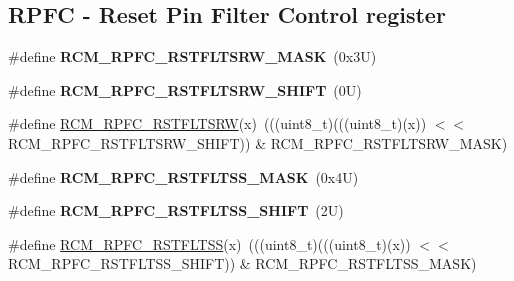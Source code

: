 \subsection*{R\+P\+FC -\/ Reset Pin Filter Control register}
\begin{DoxyCompactItemize}
\item 
\mbox{\label{group___r_c_m___register___masks_ga36e0fc448dc94b90314dd6dd2dd41763}} 
\#define {\bfseries R\+C\+M\+\_\+\+R\+P\+F\+C\+\_\+\+R\+S\+T\+F\+L\+T\+S\+R\+W\+\_\+\+M\+A\+SK}~(0x3\+U)
\item 
\mbox{\label{group___r_c_m___register___masks_gad869b7629ba10023abe459d7293fd281}} 
\#define {\bfseries R\+C\+M\+\_\+\+R\+P\+F\+C\+\_\+\+R\+S\+T\+F\+L\+T\+S\+R\+W\+\_\+\+S\+H\+I\+FT}~(0\+U)
\item 
\#define \mbox{\hyperlink{group___r_c_m___register___masks_ga9e84ee177022331e8509773374670eca}{R\+C\+M\+\_\+\+R\+P\+F\+C\+\_\+\+R\+S\+T\+F\+L\+T\+S\+RW}}(x)~(((uint8\+\_\+t)(((uint8\+\_\+t)(x)) $<$$<$ R\+C\+M\+\_\+\+R\+P\+F\+C\+\_\+\+R\+S\+T\+F\+L\+T\+S\+R\+W\+\_\+\+S\+H\+I\+FT)) \& R\+C\+M\+\_\+\+R\+P\+F\+C\+\_\+\+R\+S\+T\+F\+L\+T\+S\+R\+W\+\_\+\+M\+A\+SK)
\item 
\mbox{\label{group___r_c_m___register___masks_gadfb0f8132fbbc978c9756a2adfbf2ed0}} 
\#define {\bfseries R\+C\+M\+\_\+\+R\+P\+F\+C\+\_\+\+R\+S\+T\+F\+L\+T\+S\+S\+\_\+\+M\+A\+SK}~(0x4\+U)
\item 
\mbox{\label{group___r_c_m___register___masks_ga4c39eb26fa537bf5e4e6b0ea82ffaeb2}} 
\#define {\bfseries R\+C\+M\+\_\+\+R\+P\+F\+C\+\_\+\+R\+S\+T\+F\+L\+T\+S\+S\+\_\+\+S\+H\+I\+FT}~(2\+U)
\item 
\#define \mbox{\hyperlink{group___r_c_m___register___masks_ga56fcda592bc39cd3784fa6a65e8ae686}{R\+C\+M\+\_\+\+R\+P\+F\+C\+\_\+\+R\+S\+T\+F\+L\+T\+SS}}(x)~(((uint8\+\_\+t)(((uint8\+\_\+t)(x)) $<$$<$ R\+C\+M\+\_\+\+R\+P\+F\+C\+\_\+\+R\+S\+T\+F\+L\+T\+S\+S\+\_\+\+S\+H\+I\+FT)) \& R\+C\+M\+\_\+\+R\+P\+F\+C\+\_\+\+R\+S\+T\+F\+L\+T\+S\+S\+\_\+\+M\+A\+SK)
\end{DoxyCompactItemize}
